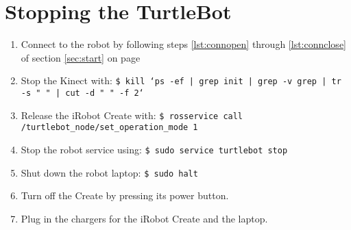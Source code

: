 \documentclass{article}
\begin{document}
\section{Stopping the TurtleBot}
\begin{enumerate}
\item{Connect to the robot by following steps \ref{lst:connopen} through \ref{lst:connclose} of section \ref{sec:start} on page \pageref{sec:start}}
\item{Stop the Kinect with: \texttt{\$\ kill `ps -ef | grep init | grep -v grep | tr -s " " | cut -d " " -f 2`}}
\item{Release the iRobot Create with: \texttt{\$\ rosservice call /turtlebot\_node/set\_operation\_mode 1}}
\item{Stop the robot service using: \texttt{\$\ sudo service turtlebot stop}}
\item{Shut down the robot laptop: \texttt{\$\ sudo halt}}
\item{Turn off the Create by pressing its power button.}
\item{Plug in the chargers for the iRobot Create and the laptop.}
\end{enumerate}
\end{document}
